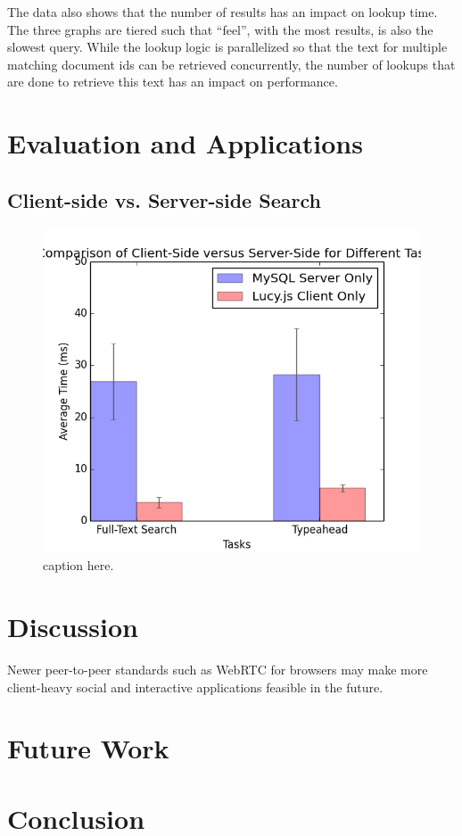 \documentclass{vldb}
\begin{document}
The data also shows that the number of results has an  impact on lookup time. The three graphs are tiered such that ``feel'', with the most results, is also the slowest query. While the lookup logic is parallelized so that the text for multiple matching document ids can be retrieved concurrently, the number of lookups that are done to retrieve this text has an impact on performance.




\section{Evaluation and Applications}

\subsection{Client-side vs. Server-side Search}




\begin{figure}[h!]
   \includegraphics[scale=.53]{demo_results}
  \caption{caption here.}
\end{figure}



\section{Discussion}


Newer peer-to-peer standards such as WebRTC for browsers may make more client-heavy social and interactive applications feasible in the future.

\section{Future Work}

\section{Conclusion}



\end{document}
